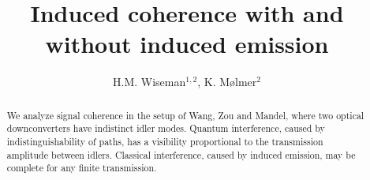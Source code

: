 

\draft

\title{Induced coherence with and without induced emission}
\author{H.M. Wiseman$^{1,2}$, K. M\o lmer$^{2}$}
\address{$^{1}$School of Science, Griffith University, Nathan, Brisbane,
Queensland 4111 Australia. \\
$^{2}$Institute of Physics and Astronomy, University of Aarhus,
DK 8000 \AA rhus C, Denmark.}
\maketitle

\begin{abstract}
We analyze signal coherence in the setup of Wang, Zou and Mandel, 
where two optical downconverters have indistinct idler modes. 
Quantum interference, caused by indistinguishability of paths, 
has a visibility proportional to the transmission amplitude between idlers. 
Classical interference, caused by induced emission, may be complete 
for any finite transmission.

\end{abstract}

\newcommand{\beq}{\begin{equation}}
\newcommand{\eeq}{\end{equation}}
\newcommand{\bqa}{\begin{eqnarray}}
\newcommand{\eqa}{\end{eqnarray}}
\newcommand{\nn}{\nonumber}
\newcommand{\nl}[1]{\nn \\ && {#1}\,}
\newcommand{\erf}[1]{Eq.~(\ref{#1})}
\newcommand{\dg}{^\dagger}
\newcommand{\sq}[1]{\left[ {#1} \right]}
\newcommand{\cu}[1]{\left\{ {#1} \right\}}
\newcommand{\ro}[1]{\left( {#1} \right)}
\newcommand{\an}[1]{\left\langle{#1}\right\rangle}
\newcommand{\vl}[1]{\left|{#1}\right|}

